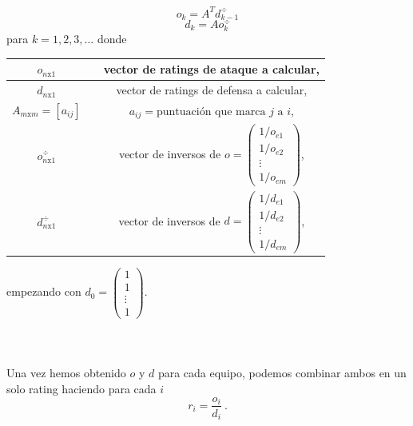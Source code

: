 \begin{equation}
o_{k} = A^{T} d_{k-1}^{\div} \label{ataq}
\end{equation}
\begin{equation}
d_{k} = A o_{k}^{\div} \label{defen}
\end{equation}
para $k=1,2,3,\dots$ donde
\begin{center}
	\begin{tabular}{ccc}
		\hline  $o_{n\text{x}1}$ & & vector de ratings de ataque a calcular, \\
		\hline  $d_{n\text{x}1}$ & & vector de ratings de defensa a calcular, \\
		\hline $A_{m\text{x}m}=[a_{ij}]$ & & $a_{ij}=\text{puntuación que marca } j \text{ a } i$,  \\ 
		\hline  $o_{n\text{x}1}^{\div}$ & & vector de inversos de $o = 		\left(\begin{array}{c}
		1/o_{e1}\\
		1/o_{e2}\\
		\vdots \\
		1/o_{em}
		\end{array} \right)$, \\
		\hline  $d_{n\text{x}1}^{\div}$ & & vector de inversos de $d = 		\left(\begin{array}{c}
		1/d_{e1}\\
		1/d_{e2}\\
		\vdots \\
		1/d_{em}
		\end{array} \right)$, \\
		\hline 
	\end{tabular}
\end{center} 

empezando con
$d_{0}=
\left(\begin{array}{c}
1\\
1\\
\vdots \\
1
\end{array} \right) $.
\ \\
\ \\
\ \\
\ \\
Una vez hemos obtenido $o$ y $d$ para cada equipo, podemos combinar ambos en un solo rating haciendo para cada $i$
\begin{equation}
r_{i}= \dfrac{o_{i}}{d_{i}} \label{ODr} \ .
\end{equation}
\ \\

